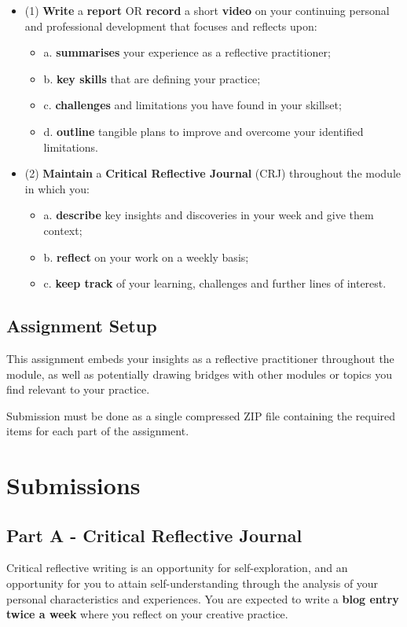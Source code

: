 \documentclass{../../fal_assignment}
\begin{document}
\begin{itemize}
		\item (1)  \textbf{Write} a \textbf{report} OR \textbf{record} a short \textbf{video} on your continuing personal and professional development that focuses and reflects upon:
		\begin{itemize}
			\item a.  \textbf{summarises} your experience as a reflective practitioner;
			\item b.  \textbf{key skills} that are defining your practice;
			\item c.  \textbf{challenges} and limitations you have found in your skillset;
			\item d.  \textbf{outline} tangible plans to improve and overcome your identified limitations.
		\end{itemize}
		\item (2)  \textbf{Maintain} a \textbf{Critical Reflective Journal} (CRJ) throughout the module in which you:
		\begin{itemize}
			\item a.  \textbf{describe} key insights and discoveries in your week and give them context;
			\item b.  \textbf{reflect} on your work on a weekly basis;
			\item c.  \textbf{keep track} of your learning, challenges and further lines of interest.
		\end{itemize}
\end{itemize}
\subsection*{Assignment Setup} 

This assignment embeds your insights as a reflective practitioner throughout the module, as well as potentially drawing bridges with other modules or topics you find relevant to your practice.

Submission must be done as a single compressed ZIP file containing the required items for each part of the assignment.
\pagebreak
\section*{Submissions}
\subsection*{Part A - Critical Reflective Journal} 

Critical reflective writing is an opportunity for self-exploration, and an opportunity for you to attain self-understanding through the analysis of your personal characteristics and experiences. You are expected to write a \textbf{blog entry twice a week} where you reflect on your creative practice.
\end{document}
